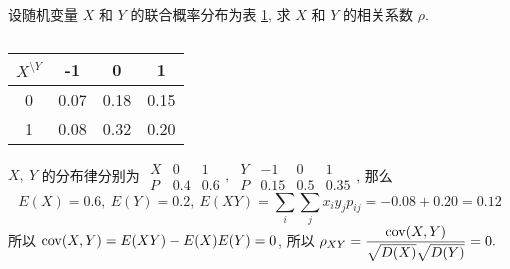 \begin{example}
    设随机变量 $X$ 和 $Y$ 的联合概率分布为表 \ref{-101007018}, 求 $X$ 和 $Y$ 的相关系数 $\rho.$
\end{example}
\begin{solution}
    \begin{minipage}{0.3\linewidth}
        \begin{table}[H]
            \centering
            \caption{}
            \label{-101007018}
            \begin{tabular}{c | c c c}
                $X^{\displaystyle\setminus Y}$ & -1   & 0    & 1    \\
                \midrule
                0                              & 0.07 & 0.18 & 0.15 \\
                1                              & 0.08 & 0.32 & 0.20
            \end{tabular}
        \end{table}
    \end{minipage}\hfill
    \begin{minipage}{0.66\linewidth}
        $X,~Y$ 的分布律分别为 $\begin{array}{c|cc}
                X & 0   & 1   \\\hline
                P & 0.4 & 0.6
            \end{array},~\begin{array}{c|ccc}
                Y & -1   & 0   & 1    \\\hline
                P & 0.15 & 0.5 & 0.35
            \end{array}$, 那么
        $$E(X)=0.6,~E(Y)=0.2,~E(XY)=\sum_i\sum_j x_iy_j p_{ij}=-0.08+0.20=0.12$$
        所以 $\mathrm{cov}(X,Y)=E(XY)-E(X)E(Y)=0$, 所以 $\rho_{XY}=\dfrac{\mathrm{cov}(X,Y)}{\sqrt{D(X)}\sqrt{D(Y)}}=0.$
    \end{minipage}
\end{solution}

